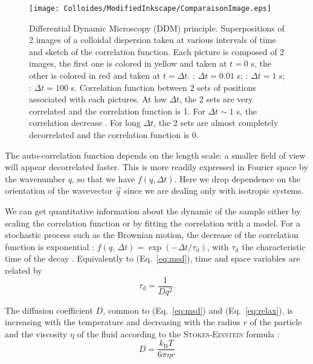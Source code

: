 \documentclass[%
 aip,
 jmp,%
 amsmath,amssymb,
reprint,%
]{revtex4-1}
\newcommand*\circled[1]{\raisebox{0.5pt}{\textcircled{\raisebox{-.9pt} {#1}}}}
\begin{document}
\begin{figure}
\texttt{[image: Colloides/ModifiedInkscape/ComparaisonImage.eps]}
\caption{Differential Dynamic Microscopy (DDM) principle. Superpositions of 2 images of a colloidal dispersion taken at various intervals of time and sketch of the correlation function. Each picture is composed of 2 images, the first one is colored in yellow and taken at $t = 0$ s, the other is colored in red and taken at $t = \Delta t$. \protect\circled{1}: $\Delta t = 0.01$ s; \protect\circled{2}: $\Delta t = 1$ s; \protect\circled{3}: $\Delta t = 100$ s. Correlation function between 2 sets of positions associated with each pictures. At low $\Delta t$, the 2 sets are very correlated \protect\circled{1} and the correlation function is 1. For $\Delta t \sim 1$ s, the correlation decrease \protect\circled{2}. For long $\Delta t$, the 2 sets are almost completely decorrelated \protect\circled{3} and the correlation function is 0.}
\label{SketchCorrelation}
\end{figure}


The auto-correlation function depends on the length scale: a smaller field of view will appear decorrelated faster. This is more readily expressed in Fourier space by the wavenumber $q$, so that we have $f(q, \Delta t)$. Here we drop dependence on the orientation of the wavevector $\vec{q}$ since we are dealing only with isotropic systems. 

We can get quantitative information about the dynamic of the sample either by scaling the correlation function or by fitting the correlation with a model. For a stochastic process such as the Brownian motion, the decrease of the correlation function is exponential : $f(q, \, \Delta t) = \exp(-\Delta t/\tau_\text{d})$, with $\tau_\text{d}$ the characteristic time of the decay \citep{8_berne2000dynamic}. Equivalently to (Eq.~\ref{eq:msd}), time and space variables are related by
\begin{equation}
\tau_\text{d} = \frac{1}{Dq^2}.
\label{eq:relax}
\end{equation}

The diffusion coefficient $D$, common to (Eq.~\ref{eq:msd}) and (Eq.~\ref{eq:relax}), is increasing with the temperature and decreasing with the radius $r$ of the particle and the viscosity $\eta$ of the fluid according to the \textsc{Stokes-Einstein} formula \citep{9_einstein1906theory}:
\begin{equation}
D = \frac{k_\text{B} T}{6 \pi \eta r}
\end{equation}
\end{document}
